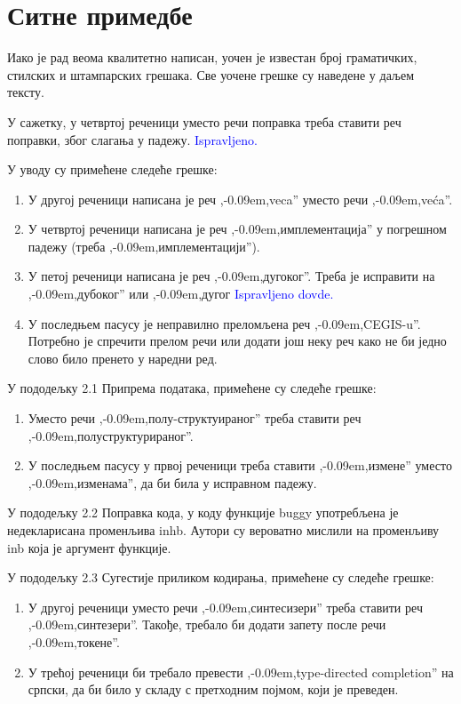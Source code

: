 \documentclass[a4paper]{report}
\newcommand{\odgovor}[1]{\textcolor{blue}{#1}}
\def\zn{,\kern-0.09em,}
\begin{document}
\section{Ситне примедбе}
\par Иако је рад веома квалитетно написан, уочен је известан број граматичких, стилских и штампарских грешака. Све уочене грешке су наведене у даљем тексту.

\par У сажетку, у четвртој реченици уместо речи поправка треба ставити реч поправки, због слагања у падежу.
\odgovor {Ispravljeno.}

\par У уводу су примећене следеће грешке:
\begin{enumerate}
\item У другој реченици написана је реч \zn veca'' уместо речи \zn veća''.
\item У четвртој реченици написана је реч \zn имплементација'' у погрешном падежу (треба \zn имплементацији'').
\
\item У петој реченици написана је реч \zn дугоког''. Треба је исправити на \zn дубоког'' или \zn дугог
\odgovor {Ispravljeno dovde.}

\item У последњем пасусу је неправилно преломљена реч \zn CEGIS-u''. Потребно је спречити прелом речи или додати још неку реч како не би једно слово било пренето у наредни ред.
\end{enumerate}

\par У пододељку 2.1 Припрема података, примећене су следеће грешке:
\begin{enumerate}
\item Уместо речи \zn полу-структуираног'' треба ставити реч \zn полуструктурираног''.
\item У последњем пасусу у првој реченици треба ставити \zn измене'' уместо \zn изменама'', да би била у исправном падежу.
\end{enumerate}

\par У пододељку 2.2 Поправка кода, у коду функције buggy употребљена је недекларисана променљива inhb. Аутори су вероватно мислили на променљиву inb која је аргумент функције.

\par У пододељку 2.3 Сугестије приликом кодирања, примећене су следеће грешке:
\begin{enumerate}
\item У другој реченици уместо речи \zn синтесизери'' треба ставити реч \zn синтезери''. Такође, требало би додати запету после речи \zn токене''.
\item У трећој реченици би требало превести \zn type-directed completion'' на српски, да би било у складу с претходним појмом, који је преведен.
\end{enumerate}
\end{document}
